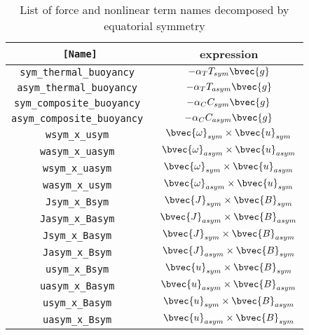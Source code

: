 \begin{table}[htp]
\caption{List of force and nonlinear term names decomposed by equatorial symmetry}
\begin{center}
\begin{tabular}{|c|c|}
\hline
{\tt [Name]} & expression  \\ \hline
\tt sym\_thermal\_buoyancy &  $ -\alpha_{T} T_{sym} \bvec{g}  $ \\
\tt asym\_thermal\_buoyancy &  $ -\alpha_{T} T_{asym} \bvec{g}  $ \\ \hline
\tt sym\_composite\_buoyancy &  $ -\alpha_{C} C_{sym} \bvec{g}  $ \\
\tt asym\_composite\_buoyancy &  $ -\alpha_{C} C_{asym} \bvec{g}  $ \\ \hline
%
\tt wsym\_x\_usym  &  $ \bvec{\omega}_{sym} \times \bvec{u}_{sym} $ \\
\tt wasym\_x\_uasym  &  $ \bvec{\omega}_{asym} \times \bvec{u}_{asym} $ \\
\tt wsym\_x\_uasym  &  $ \bvec{\omega}_{sym} \times \bvec{u}_{asym} $ \\
\tt wasym\_x\_usym  &  $ \bvec{\omega}_{asym} \times \bvec{u}_{sym} $ \\ \hline
%
\tt Jsym\_x\_Bsym  &  $ \bvec{J}_{sym} \times \bvec{B}_{sym} $ \\
\tt Jasym\_x\_Basym  &  $ \bvec{J}_{asym} \times \bvec{B}_{asym} $ \\
\tt Jsym\_x\_Basym  &  $ \bvec{J}_{sym} \times \bvec{B}_{asym} $ \\
\tt Jasym\_x\_Bsym  &  $ \bvec{J}_{asym} \times \bvec{B}_{sym} $ \\ \hline
%
\tt usym\_x\_Bsym  &  $ \bvec{u}_{sym} \times \bvec{B}_{sym} $ \\
\tt uasym\_x\_Basym  &  $ \bvec{u}_{asym} \times \bvec{B}_{asym} $ \\
\tt usym\_x\_Basym  &  $ \bvec{u}_{sym} \times \bvec{B}_{asym} $ \\
\tt uasym\_x\_Bsym  &  $ \bvec{u}_{asym} \times \bvec{B}_{sym} $ \\ \hline
\end{tabular}
\end{center}
\label{table:fields_sym2}
\end{table}
%
%

